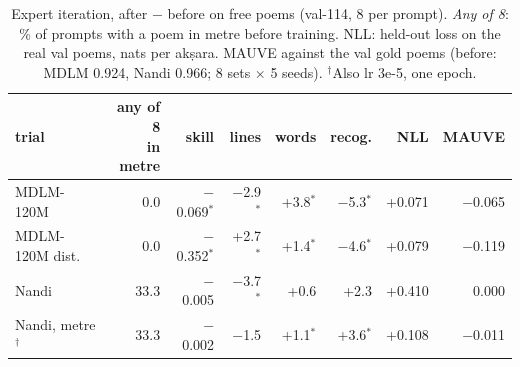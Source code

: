 \documentclass[11pt]{article}
\newcommand{\sig}{$^{\ast}$}
\begin{document}
\begin{table}[t]
\centering\scriptsize\setlength{\tabcolsep}{1.1pt}
\begin{tabular}{@{}lrrrrrrr@{}}
\toprule
trial & \makecell[r]{any of 8\\in metre} & skill & lines & words & recog. & NLL & MAUVE \\
\midrule
MDLM-120M & 0.0 & $-$0.069\sig & $-$2.9\sig & +3.8\sig & $-$5.3\sig & +0.071 & $-$0.065 \\
MDLM-120M dist. & 0.0 & $-$0.352\sig & +2.7\sig & +1.4\sig & $-$4.6\sig & +0.079 & $-$0.119 \\
Nandi & 33.3 & $-$0.005 & $-$3.7\sig & +0.6 & +2.3 & +0.410 & 0.000 \\
Nandi, metre$^\dagger$ & 33.3 & $-$0.002 & $-$1.5 & +1.1\sig & +3.6\sig & +0.108 & $-$0.011 \\
\bottomrule
\end{tabular}
\caption{Expert iteration, after $-$ before on free poems (val-114, 8 per prompt). \emph{Any of 8}: \% of
prompts with a poem in metre before training. NLL: held-out loss on the real val poems, nats per akṣara. MAUVE against the val
gold poems (before: MDLM 0.924, Nandi 0.966; 8 sets $\times$ 5 seeds). $^\dagger$Also lr 3e-5, one epoch.}
\label{tab:rl}
\end{table}
\end{document}
